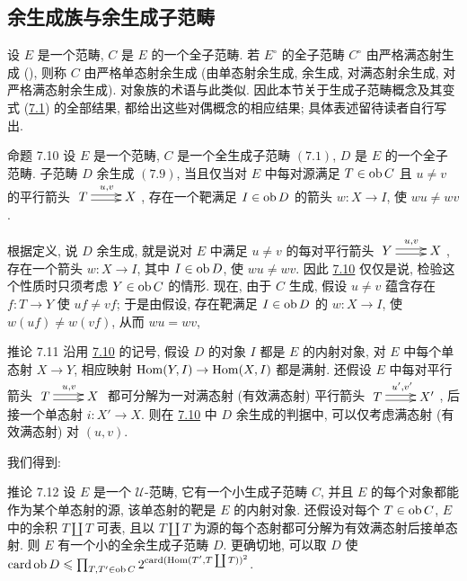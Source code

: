 \setcounter{subsection}{8}
\subsection{余生成族与余生成子范畴}

设 $E$ 是一个范畴, $C$ 是 $E$ 的一个全子范畴.
若 $E^\circ$ 的全子范畴 $C^\circ$ 由严格满态射生成 (\resp\ldotsn),
则称 $C$ 由严格单态射余生成 (\resp 由单态射余生成,
\resp 余生成, \resp 对满态射余生成, \resp 对严格满态射余生成).
对象族的术语与此类似.
因此本节关于\pageoriginale 生成子范畴概念及其变式
(\hyperref[I.def7.1]{7.1}) 的全部结果,
都给出这些对偶概念的相应结果; 具体表述留待读者自行写出.

\begin{enonce*}{命题 7.10}
设 $E$ 是一个范畴, $C$ 是一个全生成子范畴
$\hyperref[I.def7.1]{(7.1)}$, $D$ 是 $E$ 的一个全子范畴.
子范畴 $D$ 余生成 $\hyperref[I.sec7.9]{(7.9)}$,
当且仅当对 $E$ 中每对源满足 $T\in \operatorname{ob} C$ 且 $u\neq v$ 的平行箭头
$\xymatrix{ T\ar@<2pt>[r]^{u,v}\ar@<-2pt>[r]& X }$,
存在一个靶满足 $I\in \operatorname{ob} D$ 的箭头 $w:X\rightarrow I$, 使 $wu\neq wv$.
\end{enonce*}

根据定义, 说 $D$ 余生成, 就是说对 $E$ 中满足 $u\neq v$ 的每对平行箭头
$\xymatrix{ Y\ar@<2pt>[r]^{u,v}\ar@<-2pt>[r]& X
}$, 存在一个箭头 $w:X\rightarrow I$,
其中 $I\in\operatorname{ob} D$, 使 $wu\neq wv$.
因此 \hyperref[I.prop7.10]{7.10} 仅仅是说,
检验这个性质时只须考虑 $Y\in \operatorname{ob} C$ 的情形.
现在, 由于 $C$ 生成, 假设 $u\neq v$ 蕴含存在
$f:T\rightarrow Y$ 使 $uf\neq vf$;
于是由假设, 存在靶满足 $I\in\operatorname{ob} D$ 的 $w:X\rightarrow I$,
使 $w(uf)\neq w(vf)$, 从而 $wu=wv$, \cqfd

\begin{enonce*}{推论 7.11}
沿用 \hyperref[I.prop7.10]{7.10} 的记号,
假设 $D$ 的对象 $I$ 都是 $E$ 的内射对象,
\ie 对 $E$ 中每个单态射 $X\rightarrow Y$,
相应映射 $\operatorname{Hom}(Y,I)\rightarrow \operatorname{Hom}(X,I)$ 都是满射.
还假设 $E$ 中每对平行箭头 $\xymatrix{
T\ar@<2pt>[r]^{u,v}\ar@<-2pt>[r]& X }$
都可分解为一对满态射 (\resp 有效满态射) 平行箭头
$\xymatrix{ T\ar@<2pt>[r]^{u',v'}\ar@<-2pt>[r]& X' }$,
后接一个单态射 $i:X'\rightarrow X$.
则在 \hyperref[I.prop7.10]{7.10} 中 $D$ 余生成的判据中,
可以仅考虑满态射 (\resp 有效满态射) 对 $(u,v)$.
\end{enonce*}

我们\pageoriginale 得到:

\begin{enonce*}{推论 7.12}
设 $E$ 是一个 $𝒰$-范畴, 它有一个小生成子范畴 $C$,
并且 $E$ 的每个对象都能作为某个单态射的源, 该单态射的靶是 $E$ 的内射对象.
还假设对每个 $T\in\operatorname{ob} C$, $E$ 中的余积 $T\amalg T$ 可表,
且以 $T\amalg T$ 为源的每个态射都可分解为有效满态射后接单态射.
则 $E$ 有一个小的全余生成子范畴 $D$.
更确切地, 可以取 $D$ 使 $\operatorname{card} \operatorname{ob} D\leqslant
\prod_{T,T'\in \operatorname{ob} C}2^{\operatorname{card}(\operatorname{Hom}(T',T\coprod T))^2}$.
\end{enonce*}

